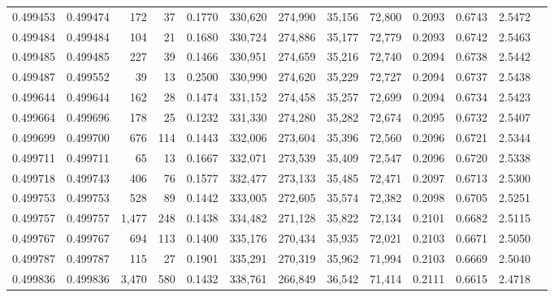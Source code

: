 \begin{tabular}{rrrrrrrrrrrrr}
0.499453 & 0.499474 &   172 &    37 &                                     0.1770 & 330,620 & 274,990 &  35,156 &  72,800 & 0.2093 & 0.6743 & 2.5472 \\
0.499484 & 0.499484 &   104 &    21 &                                     0.1680 & 330,724 & 274,886 &  35,177 &  72,779 & 0.2093 & 0.6742 & 2.5463 \\
0.499485 & 0.499485 &   227 &    39 &                                     0.1466 & 330,951 & 274,659 &  35,216 &  72,740 & 0.2094 & 0.6738 & 2.5442 \\
0.499487 & 0.499552 &    39 &    13 &                                     0.2500 & 330,990 & 274,620 &  35,229 &  72,727 & 0.2094 & 0.6737 & 2.5438 \\
0.499644 & 0.499644 &   162 &    28 &                                     0.1474 & 331,152 & 274,458 &  35,257 &  72,699 & 0.2094 & 0.6734 & 2.5423 \\
0.499664 & 0.499696 &   178 &    25 &                                     0.1232 & 331,330 & 274,280 &  35,282 &  72,674 & 0.2095 & 0.6732 & 2.5407 \\
0.499699 & 0.499700 &   676 &   114 &                                     0.1443 & 332,006 & 273,604 &  35,396 &  72,560 & 0.2096 & 0.6721 & 2.5344 \\
0.499711 & 0.499711 &    65 &    13 &                                     0.1667 & 332,071 & 273,539 &  35,409 &  72,547 & 0.2096 & 0.6720 & 2.5338 \\
0.499718 & 0.499743 &   406 &    76 &                                     0.1577 & 332,477 & 273,133 &  35,485 &  72,471 & 0.2097 & 0.6713 & 2.5300 \\
0.499753 & 0.499753 &   528 &    89 &                                     0.1442 & 333,005 & 272,605 &  35,574 &  72,382 & 0.2098 & 0.6705 & 2.5251 \\
0.499757 & 0.499757 & 1,477 &   248 &                                     0.1438 & 334,482 & 271,128 &  35,822 &  72,134 & 0.2101 & 0.6682 & 2.5115 \\
0.499767 & 0.499767 &   694 &   113 &                                     0.1400 & 335,176 & 270,434 &  35,935 &  72,021 & 0.2103 & 0.6671 & 2.5050 \\
0.499787 & 0.499787 &   115 &    27 &                                     0.1901 & 335,291 & 270,319 &  35,962 &  71,994 & 0.2103 & 0.6669 & 2.5040 \\
0.499836 & 0.499836 & 3,470 &   580 &                                     0.1432 & 338,761 & 266,849 &  36,542 &  71,414 & 0.2111 & 0.6615 & 2.4718 \\

\end{tabular}
